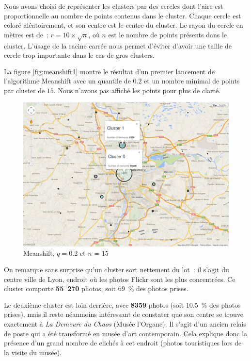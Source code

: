 Nous avons choisi de représenter les clusters par des cercles dont l'aire est proportionnelle au nombre de points contenus dans le cluster. Chaque cercle est coloré aléatoirement, et son centre est le centre du cluster.
Le rayon du cercle en mètres est de~: $r = 10 \times \sqrt{n}$, où $n$ est le nombre de points présents dans le cluster. L'usage de la racine carrée nous permet d'éviter d'avoir une taille de cercle trop importante dans le cas de gros clusters.

La figure \vref{fig:meanshift1} montre le résultat d'un premier lancement de l'algorithme Meanshift avec un quantile de $0.2$ et un nombre minimal de points par cluster de $15$. Nous n'avons pas affiché les points pour plus de clarté.

\begin{figure}[!h]
    \centering
    \includegraphics[width=16cm]{images/meanshift1.png}
    \caption{Meanshift, $q = 0.2$ et $n$ = 15}
    \label{fig:meanshift1}
\end{figure}

On remarque sans surprise qu'un cluster sort nettement du lot~: il s'agit du centre ville de Lyon, endroit où les photos Flickr sont les plus concentrées. Ce cluster comporte \textbf{55~270} photos, soit 69~\% des photos prises.

Le deuxième cluster est loin derrière, avec \textbf{8359} photos (soit 10.5~\% des photos prises), mais il reste néanmoins intéressant de constater que son centre se trouve exactement à \textit{La Demeure du Chaos} (Musée l'Organe). Il s'agit d'un ancien relais de poste qui a été transformé en musée d'art contemporain. Cela explique donc la présence d'un grand nombre de clichés à cet endroit (photos touristiques lors de la visite du musée).

